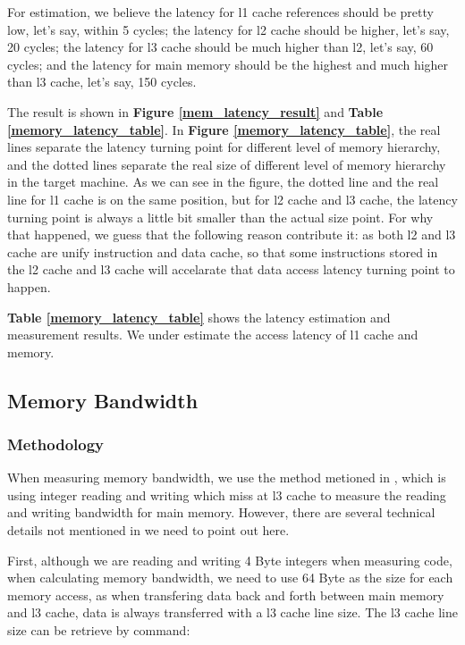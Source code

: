 For estimation, we believe the latency for l1 cache references should be pretty low, let's say, within 5 cycles; the latency for l2 cache should be higher, let's say, 20 cycles; the latency for l3 cache should be much higher than l2, let's say, 60 cycles; and the latency for main memory should be the highest and much higher than l3 cache, let's say, 150 cycles.

The result is shown in \textbf{Figure \ref{mem_latency_result}} and \textbf{Table \ref{memory_latency_table}}. In \textbf{Figure \ref{memory_latency_table}}, the real lines separate the latency turning point for different level of memory hierarchy, and the dotted lines separate the real size of different level of memory hierarchy in the target machine. As we can see in the figure, the dotted line and the real line for l1 cache is on the same position, but for l2 cache and l3 cache, the latency turning point is always a little bit smaller than the actual size point. For why that happened, we guess that the following reason contribute it: as both l2 and l3 cache are unify instruction and data cache, so that some instructions stored in the l2 cache and l3 cache will accelarate that data access latency turning point to happen.

\textbf{Table \ref{memory_latency_table}} shows the latency estimation and measurement results. We under estimate the access latency of l1 cache and memory.

\subsection{Memory Bandwidth}

\subsubsection{Methodology}

When measuring memory bandwidth, we use the method metioned in \cite{mcvoy1996lmbench}, which is using integer reading and writing which miss at l3 cache to measure the reading and writing bandwidth for main memory. However, there are several technical details not mentioned in \cite{mcvoy1996lmbench} we need to point out here.

First, although we are reading and writing 4 Byte integers when measuring code, when calculating memory bandwidth, we need to use 64 Byte as the size for each memory access, as when transfering data back and forth between main memory and l3 cache, data is always transferred with a l3 cache line size. The l3 cache line size can be retrieve by command:

